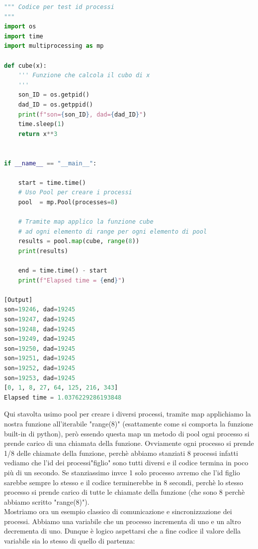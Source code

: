 \documentclass[10pt,a4paper]{article}
\begin{document}
\begin{lstlisting}[language=Python]
""" Codice per test id processi
"""
import os
import time
import multiprocessing as mp

def cube(x):
    ''' Funzione che calcola il cubo di x
    '''
    son_ID = os.getpid()
    dad_ID = os.getppid()
    print(f"son={son_ID}, dad={dad_ID}")
    time.sleep(1)
    return x**3


if __name__ == "__main__":

    start = time.time()
    # Uso Pool per creare i processi
    pool  = mp.Pool(processes=8)

    # Tramite map applico la funzione cube 
    # ad ogni elemento di range per ogni elemento di pool
    results = pool.map(cube, range(8))
    print(results)

    end = time.time() - start
    print(f"Elapsed time = {end}")

[Output]
son=19246, dad=19245
son=19247, dad=19245
son=19248, dad=19245
son=19249, dad=19245
son=19250, dad=19245
son=19251, dad=19245
son=19252, dad=19245
son=19253, dad=19245
[0, 1, 8, 27, 64, 125, 216, 343]
Elapsed time = 1.0376229286193848
\end{lstlisting}
Qui stavolta usimo pool per creare i diversi processi, tramite map applichiamo la nostra funzione all'iterabile "range(8)" (esattamente come si comporta la funzione built-in di python), però essendo questa map un metodo di pool ogni processo si prende carico di una chiamata della funzione. Ovviamente ogni processo si prende 1/8 delle chiamate della funzione, perchè abbiamo stanziati 8 processi infatti vediamo che l'id dei processi"figlio" sono tutti diversi e il codice termina in poco più di un secondo. Se stanziassimo invce 1 solo processo avremo che l'id figlio sarebbe sempre lo stesso e il codice terminerebbe in 8 secondi, perchè lo stesso processo si prende carico di tutte le chiamate della funzione (che sono 8 perchè abbiamo scritto "range(8)"). \\
Mostriamo ora un esempio classico di comunicazione e sincronizzazione dei processi. Abbiamo una variabile che un processo incrementa di uno e un altro decrementa di uno. Dunque è logico aspettarsi che a fine codice il valore della variabile sia lo stesso di quello di partenza:
\end{document}

